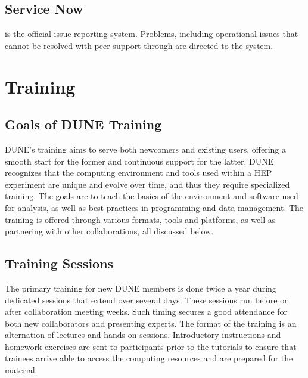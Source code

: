 \documentclass[../main-v1.tex]{subfiles}
\begin{document}
\subsection{Service Now}
 is the official  issue reporting system. Problems, including operational issues that cannot be resolved with peer support through  are directed to the  system.




\section{Training }


\subsection{Goals of DUNE Training}
DUNE’s training aims to serve both newcomers and existing users, offering a smooth start for the former and continuous support for the latter. %
DUNE recognizes that the computing environment and tools used within a HEP experiment are unique and evolve over time, and thus they require specialized training. The goals are to teach the basics of the environment and software used for analysis, as well as best practices in programming and data management. The training is offered through various formats, tools and platforms, as well as partnering with other collaborations, all discussed below. 



\subsection{Training Sessions}
The primary training for new DUNE members is done twice a year during  dedicated sessions that extend over several days. These sessions run before or after collaboration meeting weeks. Such timing secures a good attendance for both new collaborators and presenting experts.
The format of the training is an alternation of lectures and hands-on sessions. Introductory instructions and homework exercises are sent to participants prior to the tutorials to ensure that trainees 
arrive able to access the computing resources and are prepared for the material. %
\end{document}
